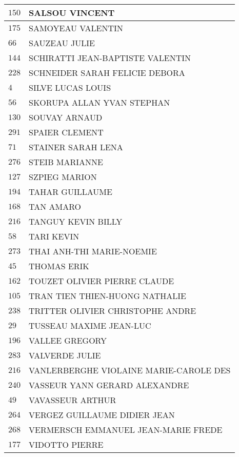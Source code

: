 \begin{xltabular}{\linewidth}{|l|X|}
    \hline
    $150$ & SALSOU VINCENT \\
    \hline
    $175$ & SAMOYEAU VALENTIN \\
    \hline
    $66$ & SAUZEAU JULIE \\
    \hline
    $144$ & SCHIRATTI JEAN-BAPTISTE VALENTIN \\
    \hline
    $228$ & SCHNEIDER SARAH FELICIE DEBORA \\
    \hline
    $4$ & SILVE LUCAS LOUIS \\
    \hline
    $56$ & SKORUPA ALLAN YVAN STEPHAN \\
    \hline
    $130$ & SOUVAY ARNAUD \\
    \hline
    $291$ & SPAIER CLEMENT \\
    \hline
    $71$ & STAINER SARAH LENA \\
    \hline
    $276$ & STEIB MARIANNE \\
    \hline
    $127$ & SZPIEG MARION \\
    \hline
    $194$ & TAHAR GUILLAUME \\
    \hline
    $168$ & TAN AMARO \\
    \hline
    $216$ & TANGUY KEVIN BILLY \\
    \hline
    $58$ & TARI KEVIN \\
    \hline
    $273$ & THAI ANH-THI MARIE-NOEMIE \\
    \hline
    $45$ & THOMAS ERIK \\
    \hline
    $162$ & TOUZET OLIVIER PIERRE CLAUDE \\
    \hline
    $105$ & TRAN TIEN THIEN-HUONG NATHALIE \\
    \hline
    $238$ & TRITTER OLIVIER CHRISTOPHE ANDRE \\
    \hline
    $29$ & TUSSEAU MAXIME JEAN-LUC \\
    \hline
    $196$ & VALLEE GREGORY \\
    \hline
    $283$ & VALVERDE JULIE \\
    \hline
    $216$ & VANLERBERGHE VIOLAINE MARIE-CAROLE DES \\
    \hline
    $240$ & VASSEUR YANN GERARD ALEXANDRE \\
    \hline
    $49$ & VAVASSEUR ARTHUR \\
    \hline
    $264$ & VERGEZ GUILLAUME DIDIER JEAN \\
    \hline
    $268$ & VERMERSCH EMMANUEL JEAN-MARIE FREDE \\
    \hline
    $177$ & VIDOTTO PIERRE \\

\end{xltabular}
